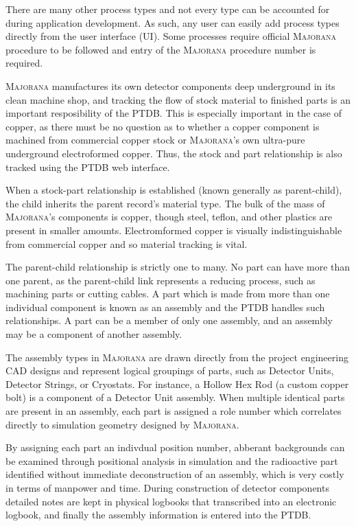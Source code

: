 \documentclass[journal]{IEEEtran}
\begin{document}
There are many other process types and not every type can
be accounted for during application development. As such, any user can 
easily add process types directly from the user interface (UI). Some processes require official \textsc{Majorana} procedure to be
followed and entry of the \textsc{Majorana} procedure number is required.

\textsc{Majorana} manufactures its own detector components deep underground in its clean machine shop, and tracking the 
flow of stock material to finished parts is an important resposibility of the PTDB. This is especially important in the case of
copper, as there must be no question as to whether a copper component is machined from commercial copper stock or
\textsc{Majorana}'s own ultra-pure underground electroformed copper. Thus, the stock and part relationship is also tracked using
the PTDB web interface. 

When a stock-part relationship is established (known generally as parent-child), the child inherits the parent record's
material type. The bulk of the mass of \textsc{Majorana}'s components is copper, though steel, teflon, and other plastics are 
present in smaller amounts. Electromformed copper is visually indistinguishable from commercial copper and so material
tracking is vital.

The parent-child relationship is strictly one to many. No part can have more than one parent, as the parent-child link
represents a reducing process, such as machining parts or cutting cables. A part which is made from more than one individual
component is known as an assembly and the PTDB handles such relationships. A part can be a member of only one assembly,
and an assembly may be a component of another assembly.

The assembly types in \textsc{Majorana} are drawn directly from the project engineering CAD designs and represent logical 
groupings of parts, such as Detector Units, Detector Strings, or Cryostats. For instance, a Hollow Hex Rod 
(a custom copper bolt) is a component of a Detector Unit assembly. When multiple identical parts are present in an assembly,
each part is assigned a role number which correlates directly to simulation geometry designed by \textsc{Majorana}. 

By assigning each part an indivdual position number, abberant backgrounds can be examined through positional analysis in 
simulation and the radioactive part identified without immediate deconstruction of an assembly, which is very costly in 
terms of manpower and time. During construction of detector components detailed notes are kept in physical logbooks that
transcribed into an electronic logbook, and finally the assembly information is entered into the PTDB.
\end{document}
